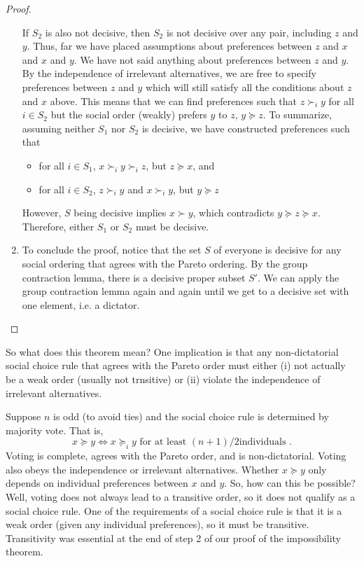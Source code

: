 \begin{proof}
\begin{enumerate}
    If $S_2$ is also not decisive, then $S_2$ is not decisive over any
    pair, including $z$ and $y$. Thus, far we have placed assumptions
    about preferences between $z$ and $x$ and $x$ and $y$. We have not
    said anything about preferences between $z$ and $y$. By the
    independence of irrelevant alternatives, we are free to specify
    preferences between $z$ and $y$ which will still satisfy all the
    conditions about $z$ and $x$ above.  This means that we can find
    preferences such that $z \succ_i y$ for all $i \in S_2$ but the
    social order (weakly) prefers $y$ to $z$, $y \succeq z$.  To
    summarize, assuming neither $S_1$ nor $S_2$ is decisive, we have
    constructed preferences such that
    \begin{itemize}
    \item for all $i \in S_1$, $x \succ_i y \succ_i z$, but $z \succeq
      x$, and
    \item for all $i \in S_2$, $z  \succ_i y$ and $x \succ_i y$, but $y \succeq z$
    \end{itemize}
    However, $S$ being decisive implies $x \succ y$, which contradicts $y
    \succeq z \succeq x$. Therefore, either $S_1$ or $S_2$ must be decisive.    
  \item To conclude the proof, notice that the set $S$ of everyone is
    decisive for any social ordering that agrees with the Pareto
    ordering. By the group contraction lemma, there is a decisive
    proper subset $S'$. We can apply the group contraction lemma again
    and again until we get to a decisive set with one element, i.e. a
    dictator.
  \end{enumerate}    
\end{proof}
So what does this theorem mean? One implication is that any
non-dictatorial social choice rule that agrees with the Pareto order
must either (i) not actually be a weak order (usually not trnsitive)
or (ii) violate the independence of irrelevant alternatives.
\begin{example}
  Suppose $n$ is odd (to avoid ties) and the social choice rule is
  determined by majority vote. That is, 
  \[ x \succeq y \iff x \succeq_i y \text{ for at least $(n+1)/2$
    individuals }. \]
  Voting is complete, agrees with the Pareto order, and is
  non-dictatorial. Voting also obeys the independence or irrelevant
  alternatives. Whether $x \succeq y$ only depends on individual
  preferences between $x$ and $y$. So, how can this be possible? Well,
  voting does not always lead to a transitive order, so it does not
  qualify as a social choice rule.  One of the
  requirements of a social choice rule is that it is a weak order
  (given any individual preferences), so it
  must be transitive. Transitivity was essential at the end of step 2
  of our proof of the impossibility theorem.  
\end{example}
